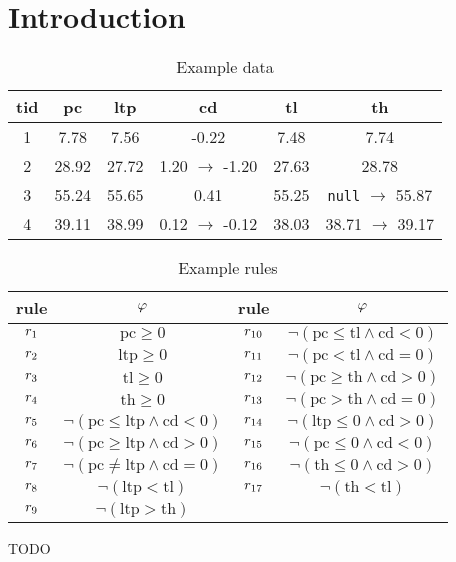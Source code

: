 \section{Introduction}
\label{sec:introduction}

\begin{table}[hb]%
    \caption{Example data}
    \label{tab:runningexampledata}
    \begin{tabular}{c||c|c|c|c|c}
        \toprule
        \textbf{tid} & \textbf{pc} & \textbf{ltp} & \textbf{cd} & \textbf{tl} & \textbf{th} \\
        \midrule
        1 & 7.78 & 7.56 & -0.22 & 7.48 & 7.74 \\
        2 & 28.92 & 27.72 & 1.20 $\rightarrow$ -1.20 & 27.63 & 28.78 \\
        3 & 55.24 & 55.65 & 0.41 & 55.25 & \texttt{null} $\rightarrow$ 55.87 \\
        4 & 39.11 & 38.99 & 0.12 $\rightarrow$ -0.12 & 38.03 & 38.71 $\rightarrow$ 39.17 \\
        \bottomrule
    \end{tabular}
\end{table}

\begin{table}[hb]%
    \caption{Example rules}
    \label{tab:runningexamplerules}
    \begin{tabular}{c|c||c|c}
        \toprule
        \textbf{rule} & $\varphi$ & \textbf{rule} & $\varphi$ \\
        \midrule
        $r_{1}$ & $\text{pc} \geq 0$ & $r_{10}$ & $\neg (\text{pc} \leq \text{tl} \wedge \text{cd} < 0)$ \\
        $r_{2}$ & $\text{ltp} \geq 0$ & $r_{11}$ & $\neg (\text{pc} < \text{tl} \wedge \text{cd} = 0)$ \\
        $r_{3}$ & $\text{tl} \geq 0$ & $r_{12}$ & $\neg (\text{pc} \geq \text{th} \wedge \text{cd} > 0)$ \\
        $r_{4}$ & $\text{th} \geq 0$ & $r_{13}$ & $\neg (\text{pc} > \text{th} \wedge \text{cd} = 0)$ \\
        $r_{5}$ & $\neg (\text{pc} \leq \text{ltp} \wedge \text{cd} < 0)$ & $r_{14}$ & $\neg (\text{ltp} \leq 0 \wedge \text{cd} > 0)$ \\
        $r_{6}$ & $\neg (\text{pc} \geq \text{ltp} \wedge \text{cd} > 0)$ & $r_{15}$ & $\neg (\text{pc} \leq 0 \wedge \text{cd} < 0)$ \\
        $r_{7}$ & $\neg (\text{pc} \neq \text{ltp} \wedge \text{cd} = 0)$ & $r_{16}$ & $\neg (\text{th} \leq 0 \wedge \text{cd} > 0)$ \\
        $r_{8}$ & $\neg (\text{ltp} < \text{tl})$ & $r_{17}$ & $\neg (\text{th} < \text{tl})$ \\
        $r_{9}$ & $\neg (\text{ltp} > \text{th})$ & & \\
        \bottomrule
    \end{tabular}
\end{table}

\begin{example}
\label{ex:runningexample}
    TODO
\end{example}
